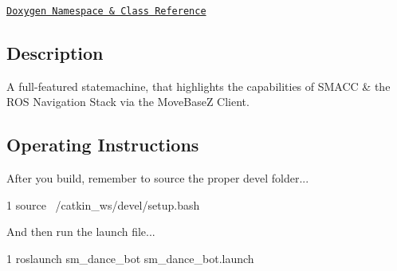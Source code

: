 \href{https://reelrbtx.github.io/SMACC/master/html/namespacesm__dance__bot.html}{\tt Doxygen Namespace \& Class Reference}

\subsection*{Description}

A full-\/featured statemachine, that highlights the capabilities of S\+M\+A\+CC \& the R\+OS Navigation Stack via the Move\+BaseZ Client. \subsection*{Operating Instructions}

After you build, remember to source the proper devel folder...


\begin{DoxyCode}
1 source ~/catkin\_ws/devel/setup.bash
\end{DoxyCode}


And then run the launch file...


\begin{DoxyCode}
1 roslaunch sm\_dance\_bot sm\_dance\_bot.launch
\end{DoxyCode}
 